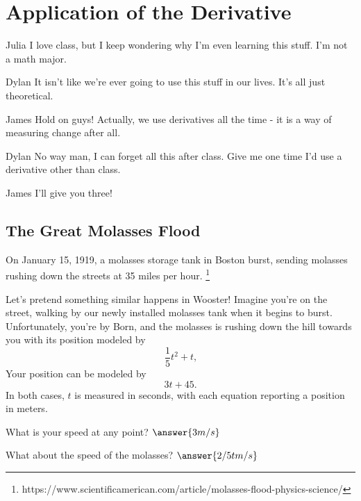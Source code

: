 \documentclass[handout]{ximera}
\begin{document}
\section{Application of the Derivative}
\begin{dialogue}
\item[Julia] I love class, but I keep wondering why I'm even learning this stuff. I'm not a math major.
\item[Dylan] It isn't like we're ever going to use this stuff in our lives. It's all just theoretical.
\item[James] Hold on guys! Actually, we use derivatives all the time - it is a way of measuring change after all.
\item[Dylan] No way man, I can forget all this after class. Give me one time I'd use a derivative other than class.
\item[James] I'll give you three!
\end{dialogue}
\subsection{The Great Molasses Flood}
On January 15, 1919, a molasses storage tank in Boston burst, sending molasses rushing down the streets at 35 miles per hour. \footnote{https://www.scientificamerican.com/article/molasses-flood-physics-science/}

Let's pretend something similar happens in Wooster! Imagine you're on the street, walking by our newly installed molasses tank when it begins to burst. Unfortunately, you're by Born, and the molasses is rushing down the hill towards you with its position modeled by $$\frac{1}{5}t^2+t \text{,}$$ Your position can be modeled by $$3t+45 \text{.}$$ In both cases, $t$ is measured in seconds, with each equation reporting a position in meters.

\setcounter{problem}{0}
\begin{question}
What is your speed at any point?  $\answer{3 m/s}$

What about the speed of the molasses? $\answer{2/5 t m/s}$
\end{question}
\end{document}
